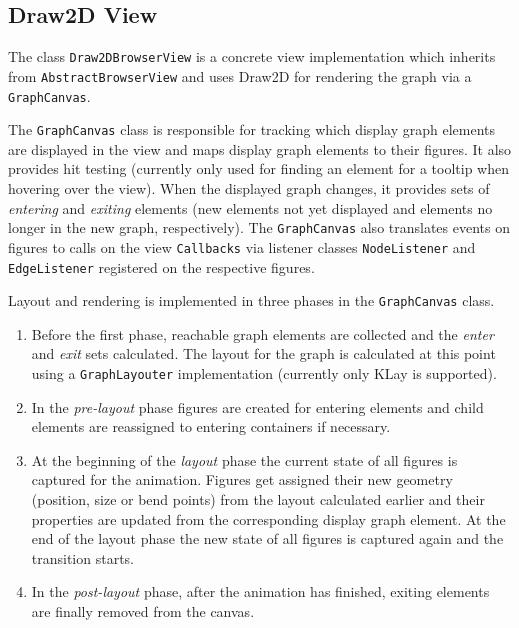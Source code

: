\subsection{Draw2D View}

The class \lstinline|Draw2DBrowserView| is a concrete view implementation which inherits from 
\lstinline|AbstractBrowserView| and uses Draw2D for rendering the graph via a \lstinline|GraphCanvas|.

The \lstinline|GraphCanvas| class is responsible for tracking which display graph elements are displayed in the view 
and maps display graph elements to their figures. It also provides hit testing (currently only used for finding an 
element for a tooltip when hovering over the view). When the displayed graph changes, it provides sets of 
\emph{entering} and \emph{exiting} elements (new elements not yet displayed and elements no longer in the new graph, 
respectively). The \lstinline|GraphCanvas| also translates events on figures to calls on the view \lstinline|Callbacks| 
via listener classes \lstinline|NodeListener| and \lstinline|EdgeListener| registered on the respective figures.

Layout and rendering is implemented in three phases in the \lstinline|GraphCanvas| class.
\begin{enumerate}[start=0]
  \item Before the first phase, reachable graph elements are collected and the \emph{enter} and \emph{exit} sets 
  calculated. The layout for the graph is calculated at this point using a \lstinline|GraphLayouter| implementation 
  (currently only KLay is supported).
  
  \item In the \emph{pre-layout} phase figures are created for entering elements and child elements are reassigned to 
  entering containers if necessary.
  
  \item At the beginning of the \emph{layout} phase the current state of all figures is captured for the animation. 
  Figures get assigned their new geometry (position, size or bend points) from the layout calculated earlier and their 
  properties are updated from the corresponding display graph element. At the end of the layout phase the new state of 
  all figures is captured again and the transition starts.
  
  \item In the \emph{post-layout} phase, after the animation has finished, exiting elements are finally removed from 
  the canvas.
\end{enumerate}

